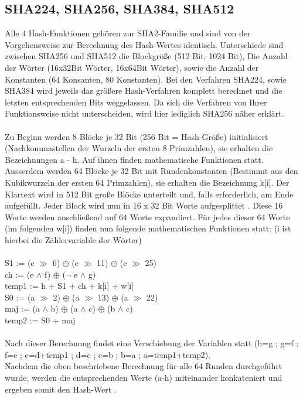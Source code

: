 \documentclass[10pt, a4paper,headsepline]{scrreprt}
\begin{document}
\subsection{SHA224, SHA256, SHA384, SHA512}
Alle 4 Hash-Funktionen gehören zur SHA2-Familie und sind von der Vorgehensweise zur Berechnung des Hash-Wertes identisch. Unterschiede sind zwischen SHA256 und SHA512 die Blockgröße (512 Bit, 1024 Bit), Die Anzahl der Wörter (16x32Bit Wörter, 16x64Bit Wörter), sowie die Anzahl der Konstanten (64 Konsanten, 80 Konstanten). Bei den Verfahren SHA224, sowie SHA384 wird jeweils das größere Hash-Verfahren komplett berechnet und die letzten entsprechenden Bits weggelassen. Da sich die Verfahren von Ihrer Funktionsweise nicht unterscheiden, wird hier lediglich SHA256 näher erklärt.  \\ \\
Zu Beginn werden 8 Blöcke je 32 Bit (256 Bit = Hash-Größe) initialisiert (Nachkommastellen der Wurzeln der ersten 8 Primzahlen), sie erhalten die Bezeichnungen a - h. Auf ihnen finden mathematische Funktionen statt. Ausserdem werden 64 Blöcke je 32 Bit mit Rundenkonstanten (Bestimmt aus den Kubikwurzeln der ersten 64 Primzahlen), sie erhalten die Bezeichnung k[i].
Der Klartext wird in 512 Bit große Blöcke unterteilt und, falls erforderlich, am Ende aufgefüllt. Jeder Block wird nun in 16 x 32 Bit Worte aufgesplittet . Diese 16 Worte werden anschließend auf 64 Worte expandiert. Für jedes dieser 64 Worte (im folgenden w[i]) finden nun folgende mathematischen Funktionen statt: (i ist hierbei die Zählervariable der Wörter) \\ \\
S1 := (e $\gg$ 6) $\oplus$ (e $\gg$ 11) $\oplus$ (e $\gg$ 25) \\
ch := (e $\land$ f) $\oplus$ ($\lnot$ e $\land$ g) \\
temp1 := h + S1 + ch + k[i] + w[i]\\
S0 := (a $\gg$ 2) $\oplus$ (a $\gg$ 13) $\oplus$ (a $\gg$ 22) \\
maj := (a $\land$ b) $\oplus$ (a $\land$ c) $\oplus$ (b $\land$ c) \\
temp2 := S0 + maj \\ \\
Nach dieser Berechnung findet eine Verschiebung der Variablen statt (h=g ; g=f ; f=e ; e=d+temp1 ; d=c ; c=b ; b=a ; a=temp1+temp2). \\
Nachdem die oben beschriebene Berechnung für alle 64 Runden durchgeführt wurde, werden die entsprechenden Werte (a-h) miteinander konkateniert und ergeben somit den Hash-Wert \cite{website:nist-sha} \citep[S. 89f]{book:practical-crypto}.
\end{document}
